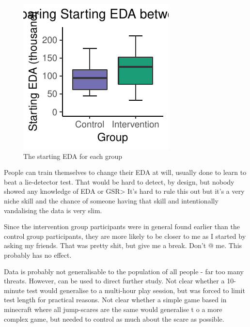 \documentclass[12pt,a4paper]{article}\usepackage[]{graphicx}\usepackage[]{color}
\makeatletter
\def\maxwidth{ %
  \ifdim\Gin@nat@width>\linewidth
    \linewidth
  \else
    \Gin@nat@width
  \fi
}
\makeatother
\begin{document}
\begin{figure}[htb]


{\centering \includegraphics[width=\maxwidth]{figure/StartingEda-1} 

}



	\caption{The starting EDA for each group}
	\label{fig:StartingEda}
\end{figure}


People can train themselves to change their EDA at will, usually done to learn to beat a lie-detector test. That would be hard to detect, by design, but nobody showed any knowledge of EDA or GSR> It's hard to rule this out but it's a very niche skill and the chance of someone having that skill and intentionally vandalising the data is very slim.

Since the intervention group participants were in general found earlier than the control group participants, they are more likely to be closer to me as I started by asking my friends. That was pretty shit, but give me a break. Don't @ me. This probably has no effect.

Data is probably not generalisable to the population of all people - far too many threats. However, can be used to direct further study.
Not clear whether a 10-minute test would generalise to a multi-hour play session, but was forced to limit test length for practical reasons.
Not clear whether a simple game based in minecraft where all jump-scares are the same would generalise t o a more complex game, but needed to control as much about the scare as possible.
\end{document}

